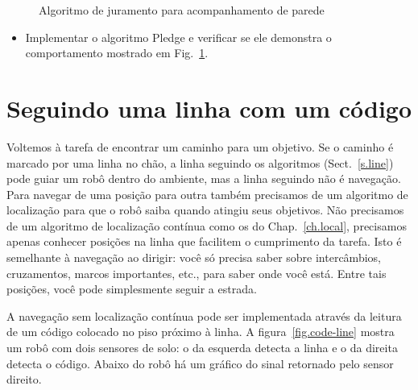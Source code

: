 \begin{figure}
\begin{center}
\caption{Algoritmo de juramento para acompanhamento de parede}\label{fig.wall-following-pledge}
\end{center}
\end{figure}

\begin{framed}
\begin{itemize}
\item Implementar o algoritmo Pledge e verificar se ele demonstra o comportamento mostrado em Fig.~\ref{fig.wall-following-pledge}.
\end{itemize}
\end{framed}

\section{Seguindo uma linha com um código}\label{s.no-localization}

Voltemos à tarefa de encontrar um caminho para um objetivo. Se o caminho é marcado por uma linha no chão, a linha seguindo os algoritmos (Sect.~\ref{s.line}) pode guiar um robô dentro do ambiente, mas a linha seguindo não é navegação. Para navegar de uma posição para outra também precisamos de um algoritmo de localização para que o robô saiba quando atingiu seus objetivos. Não precisamos de um algoritmo de localização contínua como os do Chap.~\ref{ch.local}, precisamos apenas conhecer posições na linha que facilitem o cumprimento da tarefa. Isto é semelhante à navegação ao dirigir: você só precisa saber sobre intercâmbios, cruzamentos, marcos importantes, etc., para saber onde você está. Entre tais posições, você pode simplesmente seguir a estrada.

A navegação sem localização contínua pode ser implementada através da leitura de um código colocado no piso próximo à linha. A figura~\ref{fig.code-line} mostra um robô com dois sensores de solo: o da esquerda detecta a linha e o da direita detecta o código. Abaixo do robô há um gráfico do sinal retornado pelo sensor direito.

